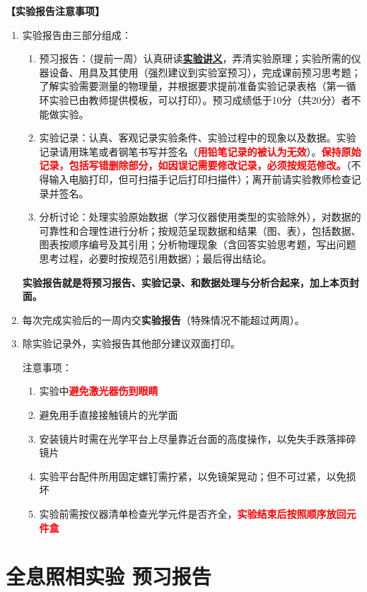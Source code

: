 \documentclass[dvipsnames, svgnames,a4paper,11pt]{article}
\begin{document}
\textbf{【实验报告注意事项】}
\begin{enumerate}
	\item 实验报告由三部分组成：
	\begin{enumerate}
		\item 预习报告：（提前一周）认真研读\underline{\textbf{实验讲义}}，弄清实验原理；实验所需的仪器设备、用具及其使用（强烈建议到实验室预习），完成课前预习思考题；了解实验需要测量的物理量，并根据要求提前准备实验记录表格（第一循环实验已由教师提供模板，可以打印）。预习成绩低于10分（共20分）者不能做实验。
	    \item 实验记录：认真、客观记录实验条件、实验过程中的现象以及数据。实验记录请用珠笔或者钢笔书写并签名（\textcolor{red}{\textbf{用铅笔记录的被认为无效}}）。\textcolor{red}{\textbf{保持原始记录，包括写错删除部分，如因误记需要修改记录，必须按规范修改。}}（不得输入电脑打印，但可扫描手记后打印扫描件）；离开前请实验教师检查记录并签名。
	    \item 分析讨论：处理实验原始数据（学习仪器使用类型的实验除外），对数据的可靠性和合理性进行分析；按规范呈现数据和结果（图、表），包括数据、图表按顺序编号及其引用；分析物理现象（含回答实验思考题，写出问题思考过程，必要时按规范引用数据）；最后得出结论。
	\end{enumerate}
	\textbf{实验报告就是将预习报告、实验记录、和数据处理与分析合起来，加上本页封面。}
	\item 每次完成实验后的一周内交\textbf{实验报告}（特殊情况不能超过两周）。
	\item 除实验记录外，实验报告其他部分建议双面打印。
	
	注意事项：
	\begin{enumerate}
		\item 实验中\textcolor{red}{\textbf{避免激光器伤到眼睛}}
		\item 避免用手直接接触镜片的光学面
		\item 安装镜片时需在光学平台上尽量靠近台面的高度操作，以免失手跌落摔碎镜片
		\item 实验平台配件所用固定螺钉需拧紧，以免镜架晃动；但不可过紧，以免损坏
		\item 实验前需按仪器清单检查光学元件是否齐全，\textcolor{red}{\textbf{实验结束后按照顺序放回元件盒}}
		
	\end{enumerate}
\end{enumerate}


\clearpage
\tableofcontents
\clearpage

\setcounter{section}{0}
\section{全息照相实验 \quad\heiti 预习报告}
	
\end{document}
